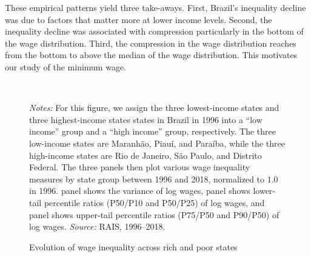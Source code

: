 These empirical patterns yield three take-aways. First, Brazil's inequality decline was due to factors that matter more at lower income levels. Second, the inequality decline was associated with compression particularly in the bottom of the wage distribution. Third, the compression in the wage distribution reaches from the bottom to above the median of the wage distribution. This motivates our study of the minimum wage.


\begin{figure}[!htb]
  \centering
  \caption{\label{fig:Inequality_evolution}Evolution of wage inequality across rich and poor states}
  \prefigvspace
  \\
  \postfigvspace
  \begin{minipage}[t]{1\columnwidth}%
    \begin{spacing}{0.75}
      \emph{\scriptsize{}Notes: }{\scriptsize{}For this figure, we assign the three lowest-income states and three highest-income
      states states in Brazil in 1996 into a ``low income'' group and a ``high income'' group, respectively. The three low-income states are Maranh{\~{a}}o, Piau{\'{i}}, and Para{\'{i}}ba, while the three high-income states are Rio de Janeiro, S{\~{a}}o Paulo, and Distrito Federal. The three panels then plot various wage inequality measures by state group between 1996 and 2018, normalized to $1.0$ in 1996.
      panel  shows the variance
      of log wages, panel  shows
      lower-tail percentile ratios (P50/P10 and P50/P25) of log wages, and panel 
      shows upper-tail percentile ratios (P75/P50 and P90/P50) of log wages. %
      \emph{\scriptsize{}Source: } RAIS, 1996--2018.}
    \end{spacing}
  \end{minipage}
\end{figure}





